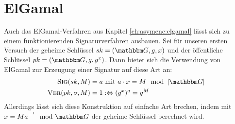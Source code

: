 \section{ElGamal}
Auch das ElGamal-Verfahren aus Kapitel \ref{ch:asymenc:elgamal} lässt sich zu einem funktionierenden Signaturverfahren ausbauen. Sei für
unseren ersten Versuch der geheime Schlüssel $\skey = (\G, g, x)$ und der öffentliche Schlüssel $\pkey = (\G, g, g^x)$. Dann bietet sich die
Verwendung von ElGamal zur Erzeugung einer Signatur auf diese Art an:
\begin{align*}
\sig(\skey,M) &= a \text{ mit } a \cdot x = M \mod \left|\G\right|\\
\ver(\pkey,\sigma,M) &= 1 :\Leftrightarrow (g^x)^a = g^M
\end{align*}
Allerdings lässt sich diese Konstruktion auf einfache Art brechen, indem mit $x = M a^{-^1} \mod \G$ der geheime Schlüssel berechnet wird.

